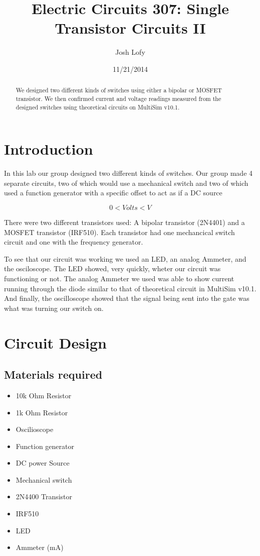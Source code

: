 \documentclass[a4paper]{article}
\title{Electric Circuits 307:
Single Transistor Circuits II}
\author{Josh Lofy}
\date{11/21/2014}
\begin{document}
\maketitle

\begin{abstract}
We designed two different kinds of switches using either a bipolar or MOSFET transistor.  We then confirmed current and voltage readings measured from the designed switches using theoretical circuits on MultiSim v10.1.  
\end{abstract}

\section{Introduction}

In this lab our group designed two different kinds of switches.  Our group made 4 separate circuits, two of which would use a mechanical switch and two of which used a function generator with a specific offset to act as if a DC source 

\[0<Volts<V\]

There were two different transistors used: A bipolar transistor (2N4401) and a MOSFET transistor (IRF510).  Each transistor had one mechancical switch circuit and one with the frequency generator.

To see that our circuit was working we used an LED, an analog Ammeter, and the osciloscope.  The LED showed, very quickly, wheter our circuit was functioning or not.  The analog Ammeter we used was able to show current running through the diode similar to that of theoretical circuit in MultiSim v10.1.  And finally, the oscilloscope showed that the signal being sent into the gate was what was turning our switch on.

\section{Circuit Design}

\subsection{Materials required}

\begin{itemize}
\item 10k Ohm Resistor
\item 1k Ohm Resistor
\item Oscilioscope
\item Function generator
\item DC power Source
\item Mechanical switch
\item 2N4400 Transistor
\item IRF510
\item LED
\item Ammeter (mA)
\end{itemize}
\end{document}
